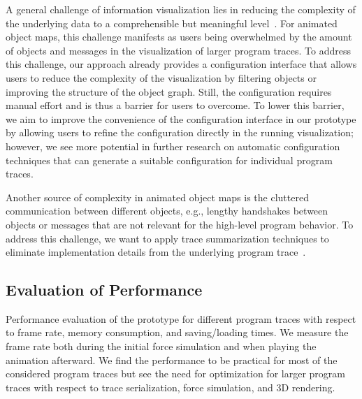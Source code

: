 A general challenge of information visualization lies in reducing the complexity of the underlying data to a comprehensible but meaningful level~\cite{robertson2009scale}.
For animated object maps, this challenge manifests as users being overwhelmed by the amount of objects and messages in the visualization of larger program traces.
To address this challenge, our approach already provides a configuration interface that allows users to reduce the complexity of the visualization by filtering objects or improving the structure of the object graph.
Still, the configuration requires manual effort and is thus a barrier for users to overcome.
To lower this barrier, we aim to improve the convenience of the configuration interface in our prototype by allowing users to refine the configuration directly in the running visualization; however, we see more potential in further research on automatic configuration techniques that can generate a suitable configuration for individual program traces.

Another source of complexity in animated object maps is the cluttered communication between different objects, e.g., lengthy handshakes between objects or messages that are not relevant for the high-level program behavior.
To address this challenge, we want to apply trace summarization techniques to eliminate implementation details from the underlying program trace~\cite{hamouLhadj2006summarizing,noda2017identifying}.

\subsection{Evaluation of Performance}

\begin{table*}
	\centering
	\caption{
		Performance evaluation of the \tfd{} prototype for different program traces with respect to frame rate, memory consumption, and saving/loading times.
		We measure the frame rate both during the initial force simulation and when playing the animation afterward.
		We find the performance to be practical for most of the considered program traces but see the need for optimization for larger program traces with respect to trace serialization, force simulation, and 3D rendering.
	}
	\label{tab:discussion/performance}
	\begin{threeparttable}
		\centering
		{\footnotesize
		}
	\end{threeparttable}
\end{table*}

